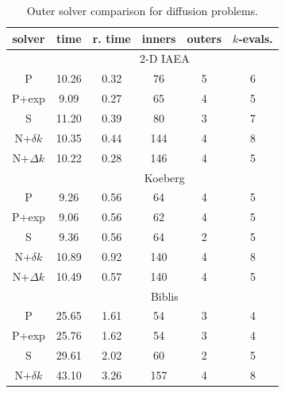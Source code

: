 \begin{table}[ht] 

 \begin{center} 
 
 \caption{Outer solver comparison for diffusion problems.} 
 \label{tbl:diffusion_outer_study} 
 
 \begin{threeparttable}
 \begin{tabular}{cccccc} 
 \toprule 
  solver & time\tnote{f}  & r. time\tnote{g} & inners & outers & $k$-evals. \\
 \midrule 
 &  \multicolumn{5}{c}{2-D IAEA} \\ 
 \midrule 
    P\tnote{a}        &     10.26 &      0.32 &           76 &            5 &            6 \\ 
    P+exp\tnote{b} &      9.09 &      0.27 &           65 &            4 &            5 \\ 
    S\tnote{c} &     11.20 &      0.39 &           80 &            3 &            7 \\ 
  N+$\delta k$\tnote{d} &     10.35 &      0.44 &          144 &            4 &            8 \\ 
  N+$\Delta k$\tnote{e} &     10.22 &      0.28 &          146 &            4 &            5 \\ 
 \midrule 
 &  \multicolumn{5}{c}{Koeberg} \\ 
 \midrule 
        P &      9.26 &      0.56 &           64 &            4 &            5 \\ 
    P+exp &      9.06 &      0.56 &           62 &            4 &            5 \\ 
    S &      9.36 &      0.56 &           64 &            2 &            5 \\ 
  N+$\delta k$ &     10.89 &      0.92 &          140 &            4 &            8 \\ 
  N+$\Delta k$ &     10.49 &      0.57 &          140 &            4 &            5 \\ 
 \midrule 
 &  \multicolumn{5}{c}{Biblis} \\ 
 \midrule 
    P &     25.65 &      1.61 &           54 &            3 &            4 \\ 
    P+exp &     25.76 &      1.62 &           54 &            3 &            4 \\ 
    S &     29.61 &      2.02 &           60 &            2 &            5 \\ 
  N+$\delta k$ &     43.10 &      3.26 &          157 &            4 &            8 \\ 

\end{tabular}
\end{threeparttable}
\end{center}
\end{table}

